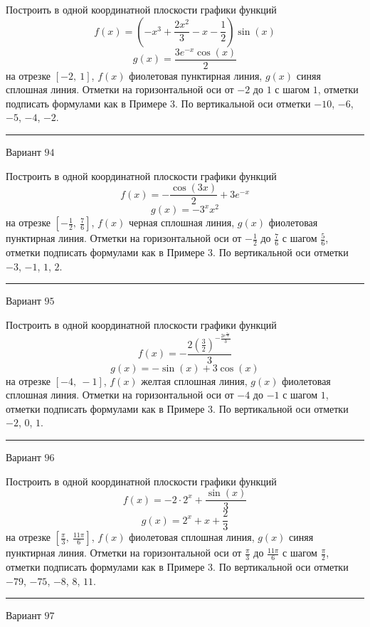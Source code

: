 \documentclass[11pt]{report}
\begin{document}
Построить в одной координатной плоскости графики функций $$f(x) = \left(- x^{3} + \frac{2 x^{2}}{3} - x - \frac{1}{2}\right) \sin{\left(x \right)}$$ $$g(x) = \frac{3 e^{- x} \cos{\left(x \right)}}{2}$$ на отрезке $\left[-2, \  1\right]$, $f(x)$ фиолетовая пунктирная линия, $g(x)$ синяя сплошная линия. Отметки на горизонтальной оси от $-2$ до $1$ с шагом $1$, отметки подписать формулами как в Примере 3. По вертикальной оси отметки $-10$, $-6$, $-5$, $-4$, $-2$.
\begin{center}
\noindent\rule{8cm}{0.4pt}
\end{center}
Вариант $94$


Построить в одной координатной плоскости графики функций $$f(x) = - \frac{\cos{\left(3 x \right)}}{2} + 3 e^{- x}$$ $$g(x) = - 3^{x} x^{2}$$ на отрезке $\left[- \frac{1}{2}, \  \frac{7}{6}\right]$, $f(x)$ черная сплошная линия, $g(x)$ фиолетовая пунктирная линия. Отметки на горизонтальной оси от $- \frac{1}{2}$ до $\frac{7}{6}$ с шагом $\frac{5}{6}$, отметки подписать формулами как в Примере 3. По вертикальной оси отметки $-3$, $-1$, $1$, $2$.
\begin{center}
\noindent\rule{8cm}{0.4pt}
\end{center}
Вариант $95$


Построить в одной координатной плоскости графики функций $$f(x) = - \frac{2 \left(\frac{3}{2}\right)^{- \frac{2 e^{\frac{2 x}{3}}}{3}}}{3}$$ $$g(x) = - \sin{\left(x \right)} + 3 \cos{\left(x \right)}$$ на отрезке $\left[-4, \  -1\right]$, $f(x)$ желтая сплошная линия, $g(x)$ фиолетовая сплошная линия. Отметки на горизонтальной оси от $-4$ до $-1$ с шагом $1$, отметки подписать формулами как в Примере 3. По вертикальной оси отметки $-2$, $0$, $1$.
\begin{center}
\noindent\rule{8cm}{0.4pt}
\end{center}
Вариант $96$


Построить в одной координатной плоскости графики функций $$f(x) = - 2 \cdot 2^{x} + \frac{\sin{\left(x \right)}}{3}$$ $$g(x) = 2^{x} + x + \frac{2}{3}$$ на отрезке $\left[\frac{\pi}{3}, \  \frac{11 \pi}{6}\right]$, $f(x)$ фиолетовая сплошная линия, $g(x)$ синяя пунктирная линия. Отметки на горизонтальной оси от $\frac{\pi}{3}$ до $\frac{11 \pi}{6}$ с шагом $\frac{\pi}{2}$, отметки подписать формулами как в Примере 3. По вертикальной оси отметки $-79$, $-75$, $-8$, $8$, $11$.
\begin{center}
\noindent\rule{8cm}{0.4pt}
\end{center}
Вариант $97$
\end{document}
